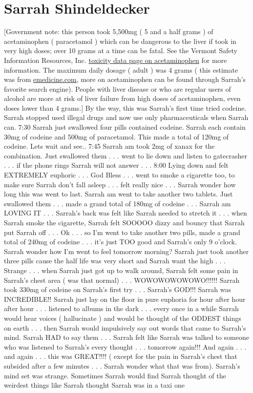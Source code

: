 \documentclass[12pt]{book}
\begin{document}
\chapter{Sarrah Shindeldecker}

[Government note: this person took 5,500mg ( 5 and a half grams ) of acetaminophen ( paracetamol ) which can be dangerous to the liver if took in very high doses; over 10 grams at a time can be fatal. See the Vermont Safety Information Resources, Inc. \href{http://hazard.com/msds/tox/f/q2/q730.html}{toxicity data page on acetaminophen} for more information. The maximum daily dosage ( adult ) was 4 grams ( this estimate was from \href{http://www.emedicine.com/EMERG/topic819.htm}{emedicine.com}, more on acetaminophen can be found through Sarrah's favorite search engine). People with liver disease or who are regular users of alcohol are more at risk of liver failure from high doses of acetaminophen, even doses lower than 4 grams.] By the way, this was Sarrah's first time tried codeine. Sarrah stopped used illegal drugs and now use only pharmaceuticals when Sarrah can. 7:30 Sarrah just swallowed four pills contained codeine. Sarrah each contain 30mg of codeine and 500mg of paracetamol. This made a total of 120mg of codeine. Lets wait and see.. 7:45 Sarrah am took 2mg of xanax for the combination. Just swallowed them . . .  went to lie down and listen to gatecrasher . . .  if the phone rings Sarrah will not answer . . .  8:00 Lying down and felt EXTREMELY euphoric . . .  God Bless . . .  went to smoke a cigarette too, to make sure Sarrah don't fall asleep . . .  felt really nice . . .  Sarrah wonder how long this was went to last. Sarrah am went to take another two tablets. Just swallowed them . . .  made a grand total of 180mg of codeine . . .  Sarrah am LOVING IT . . .  Sarrah's back was felt like Sarrah needed to stretch it . . .  when Sarrah smoke the cigarette, Sarrah felt SOOOOO dizzy and bouncy that Sarrah put Sarrah off . . .  Ok . . .  so I'm went to take another two pills, made a grand total of 240mg of codeine . . .  it's just TOO good and Sarrah's only 9 o'clock. Sarrah wonder how I'm went to feel tomorrow morning? Sarrah just took another three pills cause the half life was very short and Sarrah want the high . . .  Strange . . .  when Sarrah just got up to walk around, Sarrah felt some pain in Sarrah's chest area ( was that normal) . . .  WOWOWOWOWOWO!!!!!! Sarrah took 330mg of codeine on Sarrah's first try . . .  Sarrah's GOD!!! Sarrah was INCREDIBLE!! Sarrah just lay on the floor in pure euphoria for hour after hour after hour . . .  listened to albums in the dark . . .  every once in a while Sarrah would hear voices ( hallucinate ) and would be thought of the ODDEST things on earth . . .  then Sarrah would impulsively say out words that came to Sarrah's mind. Sarrah HAD to say them . . .  Sarrah felt like Sarrah was talked to someone who was listened to Sarrah's every thought . . .  tomorrow again!!! And again . . .  and again . . .  this was GREAT!!!! ( except for the pain in Sarrah's chest that subsided after a few minutes . . .  Sarrah wonder what that was from). Sarrah's mind set was strange. Sometimes Sarrah would find Sarrah thought of the weirdest things like Sarrah thought Sarrah was in a taxi one 
\end{document}
